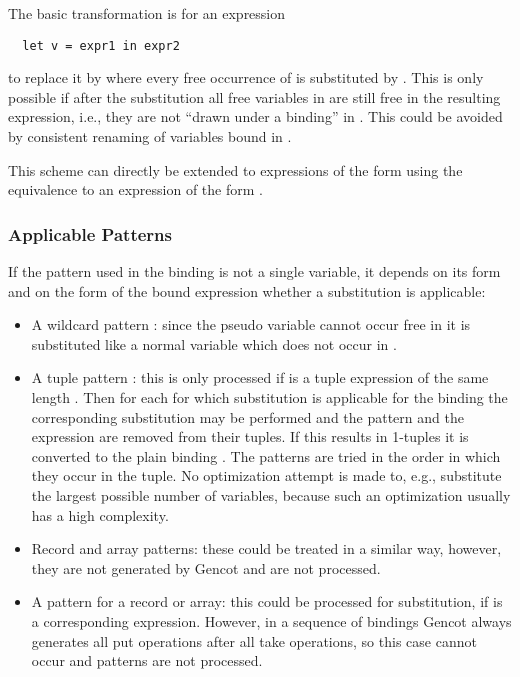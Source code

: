 The basic transformation is for an expression
\begin{verbatim}
  let v = expr1 in expr2
\end{verbatim}
to replace it by  where every free occurrence of  is substituted by . This is only 
possible if after the substitution all free variables in  are still free in the resulting expression, i.e., 
they are not ``drawn under a binding'' in . This could be avoided by consistent renaming of variables bound in 
.

This scheme can directly be extended to expressions of the form  using the
equivalence to an expression of the form .

\subsubsection{Applicable Patterns}

If the pattern used in the binding is not a single variable, it depends on its form and on the form of the bound expression whether
a substitution is applicable:
\begin{itemize}
\item A wildcard pattern \code{\_}: since the pseudo variable \code{\_} cannot occur free in  it is substituted like
a normal variable which does not occur in .
\item A tuple pattern : this is only processed if  is a tuple expression  of the 
same length . Then for each  for which substitution is applicable for the binding  the corresponding 
substitution may be performed and the pattern  and the expression  are removed from their tuples. If this results
in 1-tuples  it is converted to the plain binding . The patterns are tried in the order in which they 
occur in the tuple. No optimization attempt is made to, e.g., substitute the largest possible number of variables, because such
an optimization usually has a high complexity.
\item Record and array patterns: these could be treated in a similar way, however, they are not generated by Gencot and are not processed.
\item A  pattern for a record or array: this could be processed for substitution, if  is a corresponding 
 expression. However, in a sequence of bindings Gencot always generates all put operations after all take operations, 
so this case cannot occur and  patterns are not processed.
\end{itemize}

